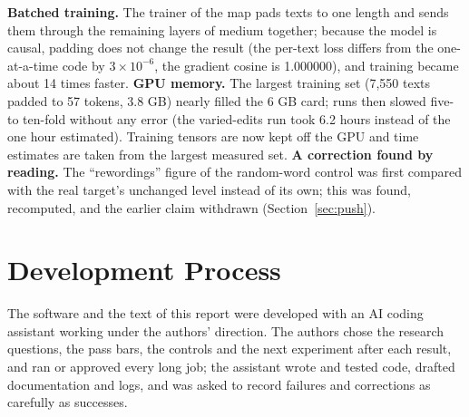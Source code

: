 \textbf{Batched training.} The trainer of the map pads texts to one length and sends them through the remaining layers of medium together; because the model is causal, padding does not change the result (the per-text loss differs from the one-at-a-time code by $3\times10^{-6}$, the gradient cosine is 1.000000), and training became about 14 times faster. \textbf{GPU memory.} The largest training set (7,550 texts padded to 57 tokens, 3.8 GB) nearly filled the 6 GB card; runs then slowed five- to ten-fold without any error (the varied-edits run took 6.2 hours instead of the one hour estimated). Training tensors are now kept off the GPU and time estimates are taken from the largest measured set. \textbf{A correction found by reading.} The ``rewordings'' figure of the random-word control was first compared with the real target's unchanged level instead of its own; this was found, recomputed, and the earlier claim withdrawn (Section~\ref{sec:push}).

\section{Development Process}

The software and the text of this report were developed with an AI coding assistant working under the authors' direction. The authors chose the research questions, the pass bars, the controls and the next experiment after each result, and ran or approved every long job; the assistant wrote and tested code, drafted documentation and logs, and was asked to record failures and corrections as carefully as successes. 
